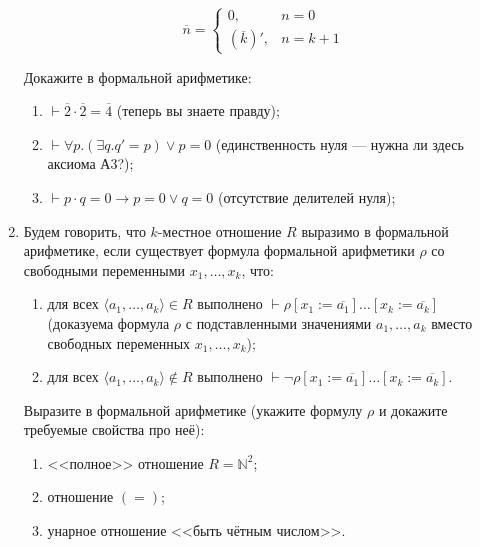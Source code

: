 \documentclass[10pt,a4paper,oneside]{article}
\begin{document}
\begin{enumerate}
$$\overline{n} = \left\{\begin{array}{ll}0, &n = 0\\
           (\overline{k})', & n=k+1\end{array}\right.$$

Докажите в формальной арифметике:
\begin{enumerate}
\item $\vdash \overline{2} \cdot \overline{2} = \overline{4}$ (теперь вы знаете правду);
\item $\vdash \forall p.(\exists q.q' = p) \vee p = 0$ (единственность нуля --- нужна ли здесь аксиома А3?);
\item $\vdash p \cdot q = 0 \rightarrow p = 0 \vee q = 0$ (отсутствие делителей нуля);
\end{enumerate}

\item Будем говорить, что $k$-местное отношение $R$ выразимо в формальной арифметике,
если существует формула формальной арифметики $\rho$ со свободными переменными $x_1, \dots, x_k$, что:
\begin{enumerate}
\item для всех $\langle a_1, \dots, a_k \rangle \in R$ выполнено $\vdash\rho[x_1 := \overline{a_1}]\dots[x_k := \overline{a_k}]$
(доказуема формула $\rho$ с подставленными значениями $a_1, \dots, a_k$ вместо свободных переменных $x_1, \dots, x_k$);
\item для всех $\langle a_1, \dots, a_k \rangle \notin R$ выполнено $\vdash\neg\rho[x_1 := \overline{a_1}]\dots[x_k := \overline{a_k}]$.
\end{enumerate}

Выразите в формальной арифметике (укажите формулу $\rho$ и докажите требуемые свойства про неё):
\begin{enumerate}
\item <<полное>> отношение $R = \mathbb{N}^2$;
\item отношение $(=)$;
\item унарное отношение <<быть чётным числом>>.
\end{enumerate}

\end{enumerate}
\end{document}
